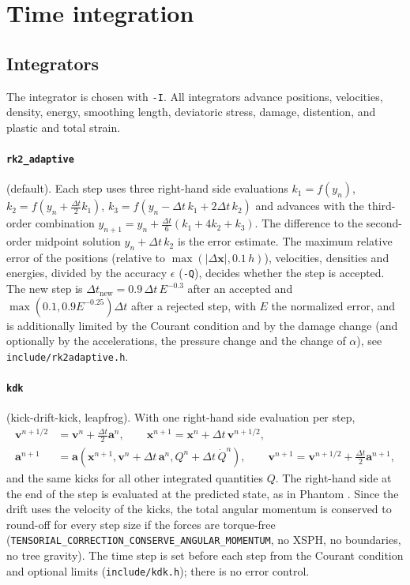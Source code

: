 \documentclass[10pt,fleqn,twoside]{article}
\renewcommand{\vec}[1]{{\mathbf #1}}
\newcommand{\code}[1]{\texttt{#1}}
\newcommand{\sw}[1]{\texttt{#1}}
\begin{document}
\section{Time integration}

\subsection{Integrators}
The integrator is chosen with \code{-I}. All integrators advance positions, velocities, density, energy, smoothing
length, deviatoric stress, damage, distention, and plastic and total strain.

\paragraph{\code{rk2\_adaptive}} (default). Each step uses three right-hand side evaluations
$k_1 = f(y_n)$, $k_2 = f(y_n + \frac{\Delta t}{2}k_1)$, $k_3 = f(y_n - \Delta t\,k_1 + 2\Delta t\,k_2)$ and
advances with the third-order combination $y_{n+1} = y_n + \frac{\Delta t}{6}(k_1 + 4k_2 + k_3)$. The difference to
the second-order midpoint solution $y_n + \Delta t\,k_2$ is the error estimate. The maximum relative error of the
positions (relative to $\max(|\Delta\vec x|, 0.1\,h)$), velocities, densities and energies, divided by the accuracy
$\epsilon$ (\code{-Q}), decides whether the step is accepted. The new step is
$\Delta t_\mathrm{new} = 0.9\,\Delta t\,E^{-0.3}$ after an accepted and $\max(0.1, 0.9E^{-0.25})\Delta t$ after a
rejected step, with $E$ the normalized error, and is additionally limited by the Courant condition and by the damage
change (and optionally by the accelerations, the pressure change and the change of $\alpha$), see
\code{include/rk2adaptive.h}.

\paragraph{\code{kdk}} (kick-drift-kick, leapfrog). With one right-hand side evaluation per step,
\begin{align}
 \vec v^{n+1/2} &= \vec v^n + \frac{\Delta t}{2}\vec a^n, \qquad \vec x^{n+1} = \vec x^n + \Delta t\,\vec v^{n+1/2},\\
 \vec a^{n+1} &= \vec a\left(\vec x^{n+1}, \vec v^n + \Delta t\,\vec a^n, Q^n + \Delta t\,\dot Q^n\right),\qquad
 \vec v^{n+1} = \vec v^{n+1/2} + \frac{\Delta t}{2}\vec a^{n+1},
\end{align}
and the same kicks for all other integrated quantities $Q$. The right-hand side at the end of the step is evaluated at
the predicted state, as in Phantom \citep{price2018}. Since the drift uses the velocity of the kicks, the total angular
momentum is conserved to round-off for every step size if the forces are torque-free
(\sw{TENSORIAL\_CORRECTION\_CONSERVE\_ANGULAR\_MOMENTUM}, no XSPH, no boundaries, no tree gravity). The time step is set
before each step from the Courant condition and optional limits (\code{include/kdk.h}); there is no error control.
\end{document}
